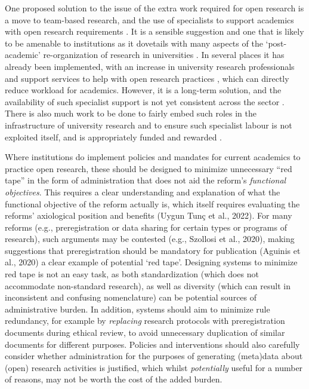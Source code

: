\documentclass[meta, authordate]{jote-new-article}
\begin{document}
One proposed solution to the issue of the extra work required for open research is a move to team-based research, and the use of specialists to support academics with open research requirements \parencites{Stewart2021}. It is a sensible suggestion and one that is likely to be amenable to institutions as it dovetails with many aspects of the ‘post-academic’ re-organization of research in universities \parencites{Ziman2000}. In several places it has already been implemented, with an increase in university research professionals and support services to help with open research practices \parencites{Carter2019}, which can directly reduce workload for academics. However, it is a long-term solution, and the availability of such specialist support is not yet consistent across the sector \parencites{Stewart2022}. There is also much work to be done to fairly embed such roles in the infrastructure of university research and to ensure such specialist labour is not exploited itself, and is appropriately funded and rewarded \parencites{Bennett2022}.



Where institutions do implement policies and mandates for current academics to practice open research, these should be designed to minimize unnecessary “red tape” in the form of administration that does not aid the reform’s \emph{functional objectives}. This requires a clear understanding and explanation of what the functional objective of the reform actually is, which itself requires evaluating the reforms’ axiological position and benefits (Uygun Tunç et al., 2022). For many reforms (e.g., preregistration or data sharing for certain types or programs of research), such arguments may be contested (e.g., Szollosi et al., 2020), making suggestions that preregistration should be mandatory for publication (Aguinis et al., 2020) a clear example of potential ‘red tape’. Designing systems to minimize red tape is not an easy task, as both standardization (which does not accommodate non-standard research), as well as diversity (which can result in inconsistent and confusing nomenclature) can be potential sources of administrative burden. In addition, systems should aim to minimize rule redundancy, for example by \emph{replacing} research protocols with preregistration documents during ethical review, to avoid unnecessary duplication of similar documents for different purposes. Policies and interventions should also carefully consider whether administration for the purposes of generating (meta)data about (open) research activities is justified, which whilst \emph{potentially} useful for a number of reasons, may not be worth the cost of the added burden.
\end{document}
